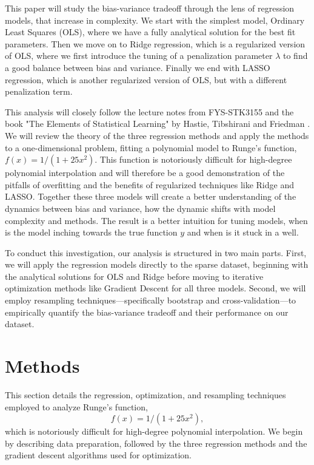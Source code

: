 \documentclass[twocolumn,aps]{revtex4}
\begin{document}
This paper will study the bias-variance tradeoff through the lens of regression models, that increase in complexity.
We start with the simplest model, Ordinary Least Squares (OLS), where we have a fully analytical solution for the best fit parameters.
Then we move on to Ridge regression, which is a regularized version of OLS, where we first introduce the tuning of a penalization parameter $\lambda$ to find a good balance between bias and variance.
Finally we end with LASSO regression, which is another regularized version of OLS, but with a different penalization term.

This analysis will closely follow the lecture notes from FYS-STK3155 \cite{compfys} and the book "The Elements of Statistical Learning" by Hastie, Tibshirani and Friedman \cite{hastie}.
We will review the theory of the three regression methods and apply the methods to a one-dimensional problem, fitting a polynomial model to Runge's function, $f(x)=1/(1+25x^2)$.
This function is notoriously difficult for high-degree polynomial interpolation and will therefore be a good demonstration of the pitfalls of overfitting and the benefits of regularized techniques like Ridge and LASSO.
Together these three models will create a better understanding of the dynamics between bias and variance, how the dynamic shifts with model complexity and methods.
The result is a better intuition for tuning models, when is the model inching towards the true function $y$ and when is it stuck in a well. 

To conduct this investigation, our analysis is structured in two main parts. 
First, we will apply the regression models directly to the sparse dataset, beginning with the analytical solutions for OLS and Ridge before moving to iterative optimization methods like Gradient Descent for all three models. 
Second, we will employ resampling techniques—specifically bootstrap and cross-validation—to empirically quantify the bias-variance tradeoff and their performance on our dataset.


\section{Methods}\label{section:methods}
This section details the regression, optimization, and resampling techniques employed to analyze 
Runge's function, $$f(x)=1/(1+25x^2),$$ which is notoriously difficult for high-degree polynomial interpolation. 
We begin by describing data preparation, followed by the three regression methods and the gradient descent algorithms used for optimization.
\end{document}
